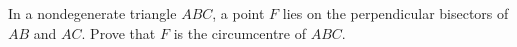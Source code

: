 In a nondegenerate triangle $ABC$, a point $F$ lies on the perpendicular bisectors of $AB$ and $AC$. Prove that $F$ is the circumcentre of $ABC$.
